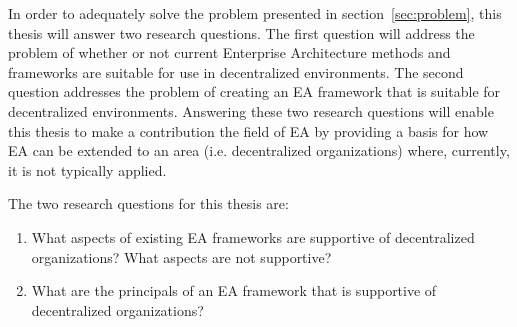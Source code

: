 In order to adequately solve the problem presented in section~\ref{sec:problem}, this thesis will answer two research questions. The first question will address the problem of whether or not current Enterprise Architecture methods and frameworks are suitable for use in decentralized environments. The second question addresses the problem of creating an EA framework that is suitable for decentralized environments. Answering these two research questions will enable this thesis to make a contribution the field of EA by providing a basis for how EA can be extended to an area (i.e. decentralized organizations) where, currently, it is not typically applied. 

The two research questions for this thesis are:

\begin{enumerate}
\item What aspects of existing EA frameworks are supportive of decentralized organizations? What aspects are not supportive?
\label{req:1}
\item What are the principals of an EA framework that is supportive of decentralized organizations?
\label{req:2}
\end{enumerate}

